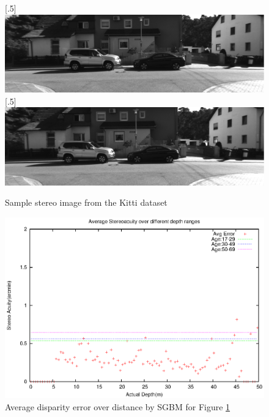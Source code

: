 \begin{figure}[h!]
\centering
{}
[.5\linewidth]{\includegraphics[scale=0.21]{000005L}}%
[.5\linewidth]{\includegraphics[scale=0.21]{000005R}}%
\caption{Sample stereo image from the Kitti dataset}
\label{fig:img5}
\end{figure}
\begin{figure}[H]
\centering
\includegraphics[scale=0.95]{sgbmimg5pix3msk}
\caption{Average disparity error over distance by SGBM for Figure \protect\ref{fig:img5}}
\label{fig:imgmsk5}
\end{figure} 
